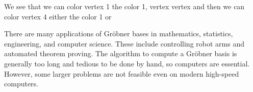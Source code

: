 \documentclass[11pt,oneside]{article}
\begin{document}
\begin{BookBody}

\noindent We see that we can color vertex 1 the color 1, vertex \BookInline{2\zeta,\allowbreak } vertex  and then we can color vertex 4 either the color 1 or \BookEnd{\blacktriangle}

There are many applications of Gröbner bases in mathematics, statistics, engineering, and computer science. These include controlling robot arms and automated theorem proving. The algorithm to compute a Gröbner basis is generally too long and tedious to be done by hand, so computers are essential. However, some larger problems are not feasible even on modern high-speed computers.

\end{BookBody}

\BookNarrativefalse
\end{document}
